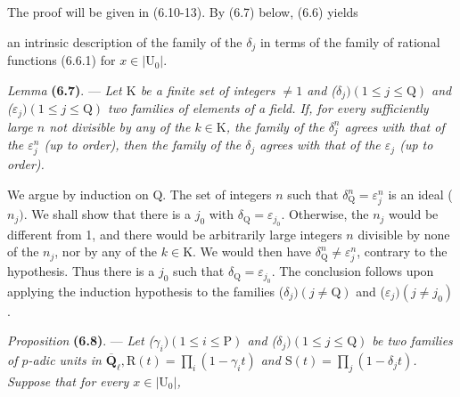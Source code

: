 \documentclass[10pt,leqno]{article}
\begin{document}
\par

\noindent The proof will be given in (6.10-13). By (6.7) below, (6.6) yields\par

\clearpage

\label{physical-26}\setcounter{page}{297}

\noindent an intrinsic description of the family of the \(\delta _{j}\) in terms of the family of rational functions (6.6.1) for \(x\in |\mathrm{U}_{0}|\).\par

\noindent \emph{Lemma} \textbf{(6.7)}. — {\itshape Let \(\mathrm{K}\) be a finite set of integers \(\ne 1\) and (\(\delta _{j}) (1\leq j\leq \mathrm{Q})\) and (\(\varepsilon _{j}) (1\leq j\leq \mathrm{Q})\) two families of elements of a field. If, for every sufficiently large \(n\) not divisible by any of the \(k\in \mathrm{K}\), the family of the \(\delta _{j}^{n}\) agrees with that of the \(\varepsilon _{j}^{n}\) (up to order), then the family of the \(\delta _{j}\) agrees with that of the \(\varepsilon _{j}\) (up to order).}\par

\noindent We argue by induction on \(\mathrm{Q}\). The set of integers \(n\) such that \(\delta _{\mathrm{Q}}^{n}=\varepsilon _{j}^{n}\) is an ideal (\(n_{j})\). We shall show that there is a \(j_{0}\) with \(\delta _{\mathrm{Q}}=\varepsilon _{j_{0}}\). Otherwise, the \(n_{j}\) would be different from 1, and there would be arbitrarily large integers \(n\) divisible by none of the \(n_{j}\), nor by any of the \(k\in \mathrm{K}\). We would then have \(\delta _{\mathrm{Q}}^{n}\ne \varepsilon _{j}^{n}\), contrary to the hypothesis. Thus there is a \(j_{0}\) such that \(\delta _{\mathrm{Q}}=\varepsilon _{j_{0}}\). The conclusion follows upon applying the induction hypothesis to the families (\(\delta _{j}) (j\ne \mathrm{Q})\) and (\(\varepsilon _{j}) (j\ne j_{0})\).\par

\noindent \emph{Proposition} \textbf{(6.8)}. — {\itshape Let (\(\gamma _{i}) (1\leq i\leq \mathrm{P})\) and (\(\delta _{j}) (1\leq j\leq \mathrm{Q})\) be two families of \(p\)-adic units in \(\overline{\mathbf{Q}}_{\ell }, \mathrm{R}(t)=\prod _{i}(1- \gamma _{i} t)\) and \(\mathrm{S}(t)=\prod _{j}(1- \delta _{j} t)\). Suppose that for every \(x\in |\mathrm{U}_{0}|\),}\par
\end{document}
